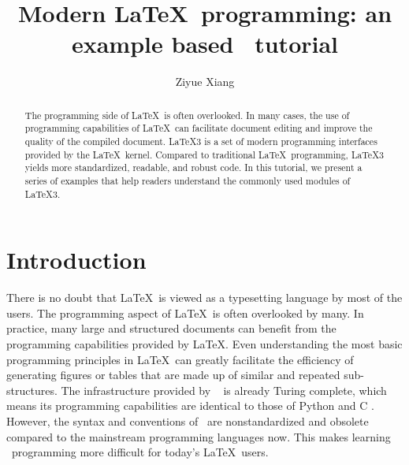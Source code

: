 \documentclass{ltugboat}
\title{Modern \LaTeX~programming: an example based \liii~tutorial}
\author{Ziyue Xiang}
\begin{document}
\begin{abstract}
The programming side of \LaTeX\ is often overlooked.
In many cases, the use of programming capabilities of \LaTeX\ can facilitate document editing and improve the quality of the compiled document.
\LaTeX3 is a set of modern programming interfaces provided by the \LaTeX\ kernel.
Compared to traditional \LaTeX\ programming, \LaTeX3 yields more standardized, readable, and robust code.
In this tutorial, we present a series of examples that help readers understand the commonly used modules of \LaTeX3.
\end{abstract}

\maketitle

\tableofcontents
\ListOfCodeExample


\section{Introduction}

There is no doubt that \LaTeX~is viewed as a typesetting language by most of the users.
The programming aspect of \LaTeX~is often overlooked by many.
In practice, many large and structured documents can benefit from the programming capabilities provided by \LaTeX. 
Even understanding the most basic programming principles in \LaTeX~can greatly facilitate the efficiency of generating figures or tables that are made up of similar and repeated sub-structures.
The infrastructure provided by \LaTeXe\ \cite{berry2017latex} is already Turing complete, which means its programming capabilities are identical to those of Python \cite{vanrossum2010python} and C \cite{ritchie1988c}.
However, the syntax and conventions of \LaTeXe~are nonstandardized and obsolete compared to the mainstream programming languages now.
This makes learning \LaTeXe~programming more difficult for today's \LaTeX~users.

\end{document}
